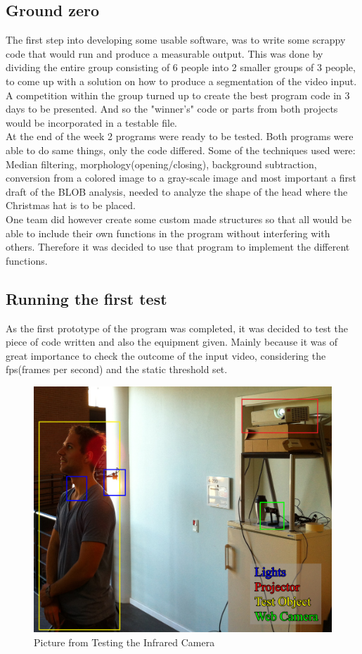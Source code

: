 \subsection{Ground zero}
The first step into developing some usable software, was to write some scrappy code that would run and produce a measurable output. This was done by dividing the entire group consisting of 6 people into 2 smaller groups of 3 people, to come up with a solution on how to produce a segmentation of the video input. A competition within the group turned up to create the best program code in 3 days to be presented. And so the "winner's" code or parts from both projects would be incorporated in a testable file.\\
At the end of the week 2 programs were ready to be tested. Both programs were able to do same things, only the code differed. Some of the techniques used were: Median filtering, morphology(opening/closing), background subtraction, conversion from a colored image to a gray-scale image and most important a first draft of the BLOB analysis, needed to analyze the shape of the head where the Christmas hat is to be placed.\\
One team did however create some custom made structures so that all would be able to include their own functions in the program without interfering with others. Therefore it was decided to use that program to implement the different functions.

\subsection{Running the first test}
As the first prototype of the program was completed, it was decided to test the piece of code written and also the equipment given. Mainly because it was of great importance to check the outcome of the input video, considering the fps(frames per second) and the static threshold set. 

\begin{figure}[htbp]
\centering
\includegraphics[width=1.00\textwidth]{Pictures/Test/TestSetup.jpg}
\caption{Picture from Testing the Infrared Camera}
\label{fig:Picture from Testing the Infrared Camera}
\end{figure} 

